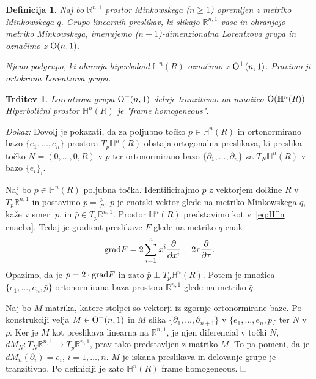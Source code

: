 \documentclass[a4paper]{article}
\newtheorem{definicija}{Definicija}
\newtheorem{trditev}{Trditev}
\def\qed{$\hfill\Box$}   %
\begin{document}
\begin{definicija}
Naj bo $\mathbb{R}^{n,1}$ prostor Minkowskega ($n \geq 1$) opremljen z metriko Minkowskega $\bar{q}$. Grupo linearnih preslikav, ki slikajo $\mathbb{R}^{n,1}$ vase in ohranjajo metriko Minkowskega, imenujemo \emph{($n+1$)-dimenzionalna Lorentzova grupa} in označimo z $\textup{O}(n,1)$.

Njeno podgrupo, ki ohranja hiperboloid $\mathbb{H}^{n}(R)$ označimo z $\textup{O}^{+}(n,1)$. Pravimo ji \emph{ortokrona Lorentzova grupa}.
\end{definicija}

\begin{trditev} \label{trd: frame-homo}
Lorentzova grupa $\textup{O}^{+}(n,1)$ deluje tranzitivno na množico $\textup{O}(\mathbb{H}^{n}(R))$. Hiperbolični prostor $\mathbb{H}^{n}(R)$ je "frame homogeneous".
\end{trditev}

\noindent
{\em Dokaz:\/} 
Dovolj je pokazati, da za poljubno točko $p \in \mathbb{H}^{n}(R)$ in ortonormirano bazo $\{e_{1}, \dots , e_{n} \}$ prostora $T_{p}\mathbb{H}^{n}(R)$ obstaja ortogonalna preslikava, ki preslika točko $N=(0, \dots , 0, R)$ v $p$ ter ortonormirano bazo $\{\partial_{1}, \dots , \partial_{n} \}$ za $T_{N}\mathbb{H}^{n}(R)$ v bazo $\{e_{i}\}_{i}$.

Naj bo $p \in \mathbb{H}^{n}(R)$ poljubna točka. Identificirajmo $p$ z vektorjem dolžine $R$ v $T_{p}\mathbb{R}^{n,1}$  in postavimo $\bar{p} = \frac{p}{R}$. $\bar{p}$ je enotski vektor glede na metriko Minkowskega $\bar{q}$, kaže v smeri $p$, in $\bar{p} \in T_{p}\mathbb{R}^{n,1}$.
Prostor $\mathbb{H}^{n}(R)$ predstavimo kot v~\ref{eq:H^n enacba}.
Tedaj je gradient preslikave $F$ glede na metriko $\bar{q}$ enak
\begin{equation}
\textup{grad} F = 2 \sum_{i=1}^{n} x^{i} \frac{\partial}{\partial x^{i}} + 2\tau \frac{\partial}{\partial \tau}. \nonumber
\end{equation} 
Opazimo, da je $\bar{p} = 2 \cdot \textup{grad} F$ in zato $\bar{p} \perp T_{p}\mathbb{H}^{n}(R)$.
Potem je množica $\{ e_{1}, \dots , e_{n}, \bar{p} \}$ ortonormirana baza prostora $\mathbb{R}^{n,1}$ glede na metriko $\bar{q}$.

Naj bo $M$ matrika, katere stolpci so vektorji iz zgornje ortonormirane baze. Po konstrukciji velja $M \in \textup{O}^{+}(n,1)$ in $M$ slika $\{\partial_{1}, \dots , \partial_{n+1} \}$ v $\{e_{1}, \dots , e_{n}, \bar{p} \}$ ter $N$ v $p$.
Ker je $M$ kot preslikava linearna na $\mathbb{R}^{n,1}$, je njen diferencial v točki $N$, $dM_{N} \colon T_{N}\mathbb{R}^{n,1} \to T_{p}\mathbb{R}^{n,1}$, prav tako predstavljen z matriko $M$. To pa pomeni, da je $dM_{n}(\partial_{i}) = e_{i}$, $i = 1, \dots , n$.
$M$ je iskana preslikava in delovanje grupe je tranzitivno. Po definiciji je zato $\mathbb{H}^{n}(R)$ frame homogeneous.
\qed
\end{document}
